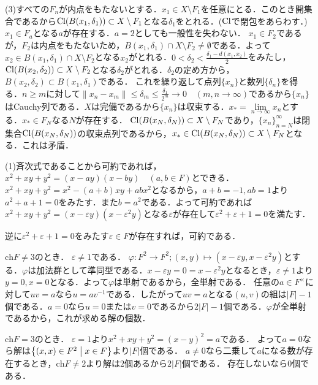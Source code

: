 \documentclass[
		book,
		head_space=20mm,
		foot_space=20mm,
		gutter=10mm,
		line_length=190mm
]{jlreq}
\begin{document}
(3)すべての$F_n$が内点をもたないとする．$x_1 \in X\setminus F_1$を任意にとる．このとき開集合であるから$\mathop{\mathrm{Cl}}(B(x_1,\delta_1))\subset X\setminus F_1$となる$\delta_1$をとれる．($\mathop{\mathrm{Cl}}$で閉包をあらわす．)$x_1 \in F_a$となる$a$が存在する．$a=2$としても一般性を失わない．
$x_1 \in F_2$であるが，$F_2$は内点をもたないため，$B(x_1,\delta_1)\cap X \setminus F_2 \neq \emptyset$である．よって$x_2 \in B(x_1,\delta_1)\cap X \setminus F_2$となる$x_2$がとれる．$0<\delta_2 < \frac{\delta_1-d(x_1,x_2)}{2}$をみたし，$\mathop{\mathrm{Cl}}(B(x_2,\delta_2))\subset X\setminus F_2$となる$\delta_2$がとれる．$\delta_2$の定め方から，$B(x_2,\delta_2)\subset B(x_1,\delta_1)$である．
これを繰り返して点列$\{x_n\}$と数列$\{ \delta_n\}$を得る．$n\ge m$に対して$\| x_n-x_m\| \le \delta_m \le \frac{\delta_1}{2^m}\rightarrow 0 \quad(m,n \rightarrow \infty)$であるから$\{x_n\}$はCauchy列である．$X$は完備であるから$\{x_n\}$は収束する．$x_*=\lim\limits_{n \to \infty} x_n$とする．$x_* \in F_N$なる$N$が存在する．
$\mathop{\mathrm{Cl}}(B(x_N,\delta_N))\subset X\setminus F_N$であり，$\{ x_n\}_{n=N}^\infty$は閉集合$\mathop{\mathrm{Cl}}(B(x_N,\delta_N))$の収束点列であるから，$x_* \in \mathop{\mathrm{Cl}}(B(x_N,\delta_N)) \subset X\setminus F_N$となる．これは矛盾．

(1)斉次式であることから可約であれば，$x^2+xy+y^2=(x-ay)(x-by) \quad(a,b\in F)$とできる．$x^2+xy+y^2=x^2-(a+b)xy+abx^2$となるから，$a+b=-1,ab=1$より$a^2+a+1=0$をみたす．また$b=a^2$である．よって可約であれば$x^2+xy+y^2=(x-\varepsilon y)(x-\varepsilon^2 y)$となる$\varepsilon$が存在して$\varepsilon^2+\varepsilon+1=0$を満たす．

逆に$\varepsilon^2+\varepsilon+1=0$をみたす$\varepsilon \in F$が存在すれば，可約である．

$\mathrm{ch}F \neq 3$のとき．
$\varepsilon \neq 1$である．
$\varphi\colon F^2\rightarrow F^2;(x,y)\mapsto (x-\varepsilon y,x-\varepsilon^2 y)$とする．$\varphi$は加法群として準同型である．$x-\varepsilon y=0=x-\varepsilon^2 y$となるとき，$\varepsilon\neq 1$より$y=0,x=0$となる．よって$\varphi$は単射であるから，全単射である．
任意の$a\in F^\times$に対して$uv=a$なら$u=av^{-1}$である．したがって$uv=a$となる$(u,v)$の組は$|F|-1$個である．$a=0$なら$u=0$または$v=0$であるから$2|F|-1$個である．$\varphi$が全単射であるから，これが求める解の個数．

$\mathrm{ch}F=3$のとき．
$\varepsilon=1$より$x^2+xy+y^2=(x-y)^2=a$である．
よって$a=0$なら解は$\left\{ (x,x)\in F^2\mathrel{}\middle|\mathrel{} x\in F\right\}$より$|F|$個である．
$a\neq 0$なら二乗して$a$になる数が存在するとき，$\mathrm{ch}F\neq 2$より解は$2$個あるから$2|F|$個である．
存在しないなら$0$個である．
\end{document}
